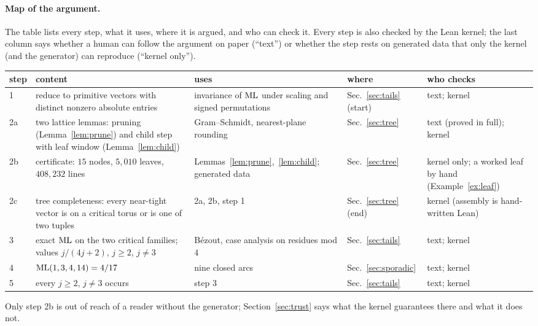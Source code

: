 \documentclass[11pt]{article}
\theoremstyle{remark}
\begin{document}
\paragraph{Map of the argument.} The table lists every step, what it uses, where it is argued, and who can check it. Every step is also checked by the Lean kernel; the last column says whether a human can follow the argument on paper (``text'') or whether the step rests on generated data that only the kernel (and the generator) can reproduce (``kernel only'').
\begin{center}
\small
\begin{tabular}{p{1.9cm}p{4.4cm}p{3.1cm}p{1.7cm}p{3.2cm}}
\toprule
step & content & uses & where & who checks\\
\midrule
1 & reduce to primitive vectors with distinct nonzero absolute entries & invariance of $\mathrm{ML}$ under scaling and signed permutations & Sec.~\ref{sec:tails} (start) & text; kernel\\
2a & two lattice lemmas: pruning (Lemma~\ref{lem:prune}) and child step with leaf window (Lemma~\ref{lem:child}) & Gram--Schmidt, nearest-plane rounding & Sec.~\ref{sec:tree} & text (proved in full); kernel\\
2b & certificate: $15$ nodes, $5{,}010$ leaves, $408{,}232$ lines & Lemmas~\ref{lem:prune},~\ref{lem:child}; generated data & Sec.~\ref{sec:tree} & kernel only; a worked leaf by hand (Example~\ref{ex:leaf})\\
2c & tree completeness: every near-tight vector is on a critical torus or is one of two tuples & 2a, 2b, step 1 & Sec.~\ref{sec:tree} (end) & kernel (assembly is hand-written Lean)\\
3 & exact $\mathrm{ML}$ on the two critical families; values $j/(4j+2)$, $j\ge2$, $j\ne3$ & B\'ezout, case analysis on residues mod $4$ & Sec.~\ref{sec:tails} & text; kernel\\
4 & $\mathrm{ML}(1,3,4,14)=4/17$ & nine closed arcs & Sec.~\ref{sec:sporadic} & text; kernel\\
5 & every $j\ge2$, $j\ne3$ occurs & step 3 & Sec.~\ref{sec:tails} & text; kernel\\
\bottomrule
\end{tabular}
\end{center}
Only step 2b is out of reach of a reader without the generator; Section~\ref{sec:trust} says what the kernel guarantees there and what it does not.
\end{document}

